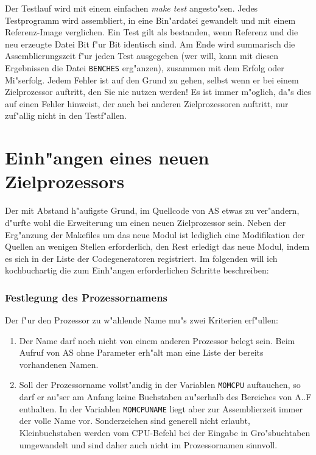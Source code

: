 \documentclass[12pt,a4paper,twoside]{report}
\newcommand{\tty}[1]{{\tt #1}}
\begin{document}
Der Testlauf wird mit einem einfachen {\em make test} angesto"sen.  Jedes
Testprogramm wird assembliert, in eine Bin"ardatei gewandelt und mit einem
Referenz-Image verglichen.  Ein Test gilt als bestanden, wenn Referenz und
die neu erzeugte Datei Bit f"ur Bit identisch sind.  Am Ende wird
summarisch die Assemblierungszeit f"ur jeden Test ausgegeben (wer will,
kann mit diesen Ergebnissen die Datei {\tt BENCHES} erg"anzen), zusammen
mit dem Erfolg oder Mi"serfolg.  Jedem Fehler ist auf den Grund zu gehen,
selbst wenn er bei einem Zielprozessor auftritt, den Sie nie nutzen
werden!  Es ist immer m"oglich, da"s dies auf einen Fehler hinweist, der
auch bei anderen Zielprozessoren auftritt, nur zuf"allig nicht in den
Testf"allen.


\section{Einh"angen eines neuen Zielprozessors}

Der mit Abstand h"aufigste Grund, im Quellcode von AS etwas zu ver"andern,
d"urfte wohl die Erweiterung um einen neuen Zielprozessor sein.  Neben der
Erg"anzung der Makefiles um das neue Modul ist lediglich eine Modifikation
der Quellen an wenigen Stellen erforderlich, den Rest erledigt das neue
Modul, indem es sich in der Liste der Codegeneratoren registriert.  Im
folgenden will ich kochbuchartig die zum Einh"angen erforderlichen
Schritte beschreiben:

\subsubsection{Festlegung des Prozessornamens}

Der f"ur den Prozessor zu w"ahlende Name mu"s zwei Kriterien erf"ullen:
\begin{enumerate}
\item{Der Name darf noch nicht von einem anderen Prozessor belegt sein.
      Beim Aufruf von AS ohne Parameter erh"alt man eine Liste der bereits
      vorhandenen Namen.}
\item{Soll der Prozessorname vollst"andig in der Variablen \tty{MOMCPU}
      auftauchen, so darf er au"ser am Anfang keine Buchstaben au"serhalb
      des Bereiches von A..F enthalten.  In der Variablen \tty{MOMCPUNAME}
      liegt aber zur Assemblierzeit immer der volle Name vor.
      Sonderzeichen sind generell nicht erlaubt, Kleinbuchstaben
      werden vom CPU-Befehl bei der Eingabe in Gro"sbuchtaben umgewandelt
      und sind daher auch nicht im Prozessornamen sinnvoll.}
\end{enumerate}
\end{document}
